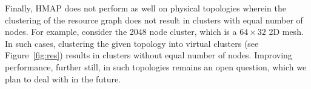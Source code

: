 Finally, HMAP does not perform as well on physical topologies wherein
the clustering of the resource graph does not result in clusters with
equal number of nodes. For example, consider the 2048 node cluster,
which is a $64\times32$ 2D mesh. In such cases, clustering the given
topology into virtual clusters (see Figure~\ref{fig:res}) results in
clusters without equal number of nodes. Improving performance, further
still, in such topologies remains an open question, which we plan to
deal with in the future.







